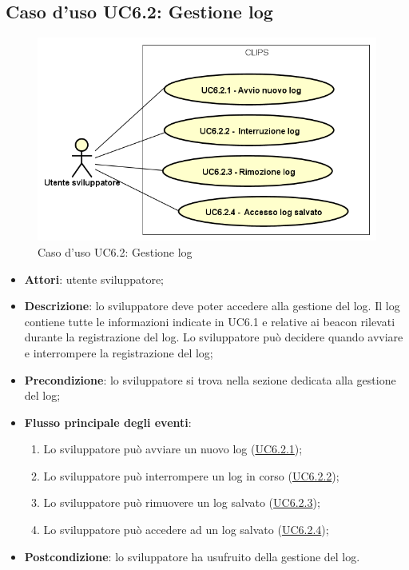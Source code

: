 \documentclass[../AnalisiDeiRequisiti.tex]{subfiles}
\begin{document}
\subsection{Caso d'uso UC6.2: Gestione log}

        \begin{figure}[H]
            \centering
            \includegraphics[scale=0.95, width=\textwidth]{img/UC6-2.png}
            \caption{Caso d'uso UC6.2: Gestione log}\label{fig:UC6.2} 
        \end{figure}
\begin{itemize}
\item \textbf{Attori}: utente sviluppatore;
\item \textbf{Descrizione}: lo sviluppatore deve poter accedere alla gestione del log. Il log contiene tutte le informazioni indicate in UC6.1 e relative ai beacon rilevati durante la registrazione del log. Lo sviluppatore può decidere quando avviare e interrompere la registrazione del log; 
      \item \textbf{Precondizione}: lo sviluppatore si trova nella sezione dedicata alla gestione del log;

        \item \textbf{Flusso principale degli eventi}:
          \begin{enumerate}
          \item Lo sviluppatore può avviare un nuovo log (\hyperlink{UC6.2.1}{UC6.2.1});
          \item Lo sviluppatore può interrompere un log in corso (\hyperlink{UC6.2.2}{UC6.2.2});
          \item Lo sviluppatore può rimuovere un log salvato (\hyperlink{UC6.2.3}{UC6.2.3});
          \item Lo sviluppatore può accedere ad un log salvato (\hyperlink{UC6.2.4}{UC6.2.4});

      \end{enumerate}
    \item \textbf{Postcondizione}: lo sviluppatore ha usufruito della gestione del log.
  \end{itemize}
\hypertarget{UC6.2.1}{}
\end{document}
